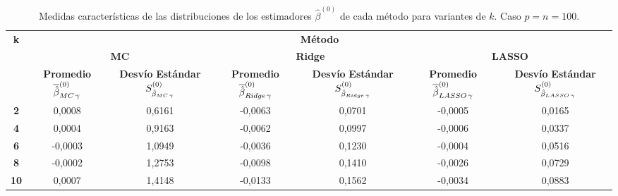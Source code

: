 \documentclass[a4paper,12pt]{report}
\begin{document}
\begin{table}[H]
\centering
\caption{Medidas características de las distribuciones de los estimadores $\hat{\beta}^{(0)}$ de cada método para variantes de $k$. Caso $p=n=100$.}
\label{tab: sit 1 B 0 med std}
\footnotesize
\begin{tabular}{c|cc|cc|cc}
\multirow{3}{*}[-2em]{\textbf{k}} & \multicolumn{6}{c}{\textbf{Método}} \\[2ex]
 & \multicolumn{2}{c}{\textbf{MC}} & \multicolumn{2}{c}{\textbf{Ridge}} & \multicolumn{2}{c}{\textbf{LASSO}} \\[2ex]
 & \scriptsize\makecell{\textbf{Promedio} \\ $\overline{\hat{\beta}}_{MC \hspace{0.05cm} \gamma}^{(0)}$} & \scriptsize\makecell{\textbf{Desvío} \\ \textbf{Estándar} \\ $S_{\hat{\beta}_{MC \hspace{0.05cm} \gamma}}^{(0)}$} & \scriptsize\makecell{\textbf{Promedio} \\ $\overline{\hat{\beta}}_{Ridge \hspace{0.05cm} \gamma}^{(0)}$} & \scriptsize\makecell{\textbf{Desvío} \\ \textbf{Estándar} \\ $S_{\hat{\beta}_{Ridge \hspace{0.05cm} \gamma}}^{(0)}$} & \scriptsize\makecell{\textbf{Promedio} \\ $\overline{\hat{\beta}}_{LASSO \hspace{0.05cm} \gamma}^{(0)}$} & \scriptsize\makecell{\textbf{Desvío} \\ \textbf{Estándar} \\ $S_{\hat{\beta}_{LASSO \hspace{0.05cm} \gamma}}^{(0)}$} \\ \hline
\textbf{2} & \hspace{0.005cm} 0,0008 & 0,6161 & -0,0063 & 0,0701 & -0,0005 & 0,0165 \\
\textbf{4} & \hspace{0.005cm} 0,0004 & 0,9163 & -0,0062 & 0,0997 & -0,0006 & 0,0337 \\
\textbf{6} & -0,0003 & 1,0949 & -0,0036 & 0,1230 & -0,0004 & 0,0516 \\
\textbf{8} & -0,0002 & 1,2753 & -0,0098 & 0,1410 & -0,0026 & 0,0729 \\
\textbf{10} & \hspace{0.005cm} 0,0007 & 1,4148 & -0,0133 & 0,1562 & -0,0034 & 0,0883 \\

\end{tabular}
\end{table}
\end{document}
